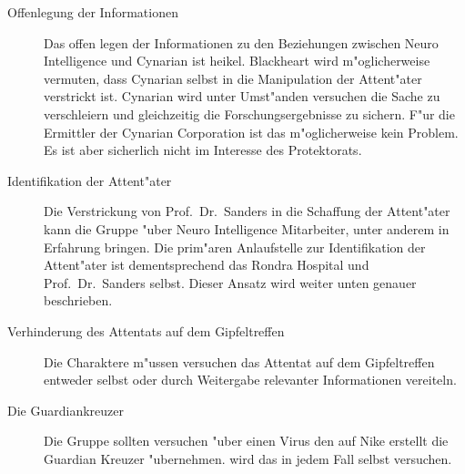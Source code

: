 \begin{description}
	\item[Offenlegung der Informationen] Das offen legen der Informationen zu den Beziehungen zwischen Neuro Intelligence und Cynarian 		
		ist heikel. Blackheart wird m"oglicherweise vermuten, dass Cynarian selbst in die Manipulation der Attent"ater verstrickt ist. Cynarian wird unter Umst"anden versuchen die Sache zu verschleiern und gleichzeitig die Forschungsergebnisse zu 	sichern. F"ur die Ermittler der Cynarian Corporation ist das m"oglicherweise kein Problem. Es ist aber sicherlich nicht im Interesse des Protektorats.
	\item[Identifikation der Attent"ater] Die Verstrickung von Prof.~Dr.~Sanders in die Schaffung der Attent"ater kann die Gruppe "uber 	
		Neuro Intelligence Mitarbeiter, unter anderem \ml{} in Erfahrung bringen. Die prim"aren Anlaufstelle zur Identifikation der Attent"ater ist dementsprechend das Rondra Hospital und Prof.~Dr.~Sanders selbst. Dieser Ansatz wird weiter unten genauer beschrieben.
	\item[Verhinderung des Attentats auf dem Gipfeltreffen] Die Charaktere m"ussen versuchen das Attentat auf dem Gipfeltreffen entweder 
		selbst oder durch Weitergabe relevanter Informationen vereiteln.
	\item[Die Guardiankreuzer] Die Gruppe sollten versuchen "uber einen Virus den \ml{} auf Nike erstellt die Guardian Kreuzer 
		"ubernehmen. \xl{} wird das in jedem Fall selbst versuchen.
\end{description}
